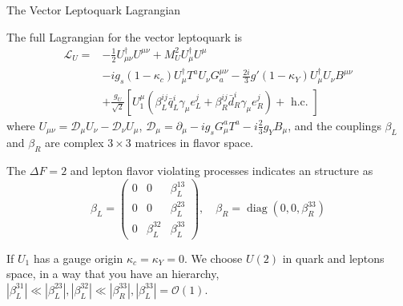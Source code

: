 \documentclass{../bredelebeamer}
\begin{document}
\begin{frame}{The Vector Leptoquark Lagrangian}
	
	The full Lagrangian for the vector leptoquark is
	\begin{align*}
		\mathcal{L}_{U}=&-\frac{1}{2} U_{\mu \nu}^{\dagger} U^{\mu \nu}+M_{U}^{2} U_{\mu}^{\dagger} U^{\mu}\\&-i g_{s}\left(1-\kappa_{c}\right) U_{\mu}^{\dagger} T^{a} U_{\nu} G^{\mu \nu}_a -\frac{2 i}{3} g'\left(1-\kappa_{Y}\right) U_{\mu}^{\dagger} U_{\nu} B^{\mu \nu}\\
		&+\frac{g_{U}}{\sqrt{2}}\left[U_{1}^{\mu}\left(\beta_{L}^{i j} \bar{q}_{L}^{i} \gamma_{\mu} e_{L}^{j}+\beta_{R}^{i j} \bar{d}_{R}^{i} \gamma_{\mu} e_{R}^{j}
		\right)+\text { h.c. }\right]
	\end{align*}
	where $U_{\mu \nu}=\mathcal D_{\mu} U_{\nu}-\mathcal D_{\nu} U_{\mu}$, $\mathcal D_{\mu}=\partial_{\mu}-i g_{s} G_{\mu}^{a} T^{a}-i \frac{2}{3} g_{Y} B_{\mu}$, and the couplings $\beta_{L}$ and $\beta_{R}$ are complex $3 \times 3$ matrices in flavor space. 
	
	\pause \vfill
	
	The $\Delta F=2$ and lepton flavor violating processes indicates an structure as 
	\begin{equation*}
		\beta_L=\left(\begin{array}{ccc}
			0 & 0 & \beta_L^{13} \\
			0 & 0 & \beta_L^{23} \\
			0 & \beta_L^{32} & \beta_L^{33}
			\end{array}\right), \quad \beta_R=\operatorname{diag}\left(0,0, \beta_R^{33}\right)
	\end{equation*}
	
	If $U_1$ has a gauge origin $\kappa_{c}=\kappa_{Y}=0$. We choose $U(2)$ in quark and leptons space, in a way that you have an hierarchy, $\left|\beta_L^{31}\right| \ll\left|\beta_L^{23}\right|,\left|\beta_L^{32}\right| \ll\left|\beta_R^{33}\right|,\left|\beta_L^{33}\right|=\mathcal{O}(1)$.
	
\end{frame}


	


	
\end{document}
